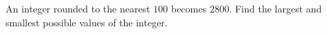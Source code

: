 An integer rounded to the nearest $100$ becomes $2800$. Find the largest and smallest possible values of the integer.
